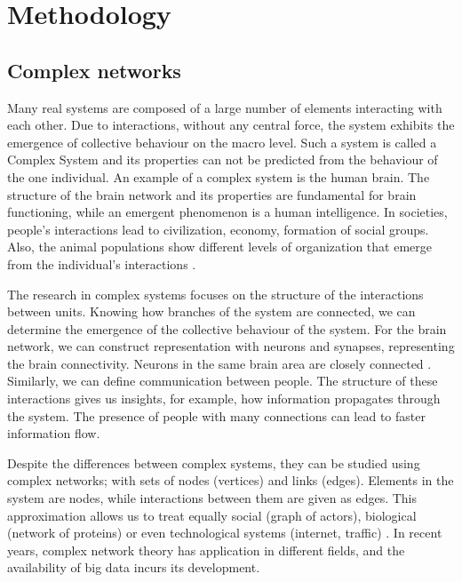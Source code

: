 \chapter{Methodology} %

\section{Complex networks}

Many real systems are composed of a large number of elements interacting with each other. Due to interactions, without any central force, the system exhibits the emergence of collective behaviour on the macro level. Such a system is called a Complex System and its properties can not be predicted from the behaviour of the one individual. An example of a complex system is the human brain. The structure of the brain network and its properties are fundamental for brain functioning, while an emergent phenomenon is a human intelligence. In societies, people's interactions lead to civilization, economy, formation of social groups. Also, the animal populations show different levels of organization that emerge from the individual's interactions \cite{boccaletti2006complex}. %

The research in complex systems focuses on the structure of the interactions between units. Knowing how branches of the system are connected, we can determine the emergence of the collective behaviour of the system. For the brain network, we can construct representation with neurons and synapses, representing the brain connectivity. Neurons in the same brain area are closely connected \cite{latora2017complex}. Similarly, we can define communication between people. The structure of these interactions gives us insights, for example, how information propagates through the system. The presence of people with many connections can lead to faster information flow. 

Despite the differences between complex systems, they can be studied using complex networks; with sets of nodes (vertices) and links (edges). Elements in the system are nodes, while interactions between them are given as edges. This approximation allows us to treat equally social (graph of actors), biological (network of proteins) or even technological systems (internet, traffic) \cite{costa2007characterization, costa2011analyzing}.  In recent years, complex network theory has application in different fields, and the availability of big data incurs its development.

